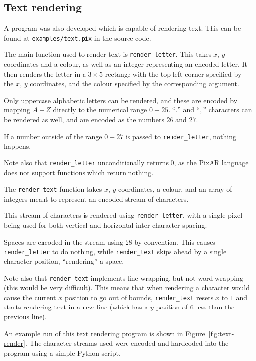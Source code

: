 \documentclass[11pt,a4paper]{scrartcl}
\begin{document}
\subsection{Text rendering}

A program was also developed which is capable of rendering text. This can be found at \verb|examples/text.pix| in the source code.

The main function used to render text is \verb|render_letter|. This takes $x$, $y$ coordinates and a colour, as well as an integer representing an encoded letter. It then renders the letter in a $3 \times 5$ rectange with the top left corner specified by the $x$, $y$ coordinates, and the colour specified by the corresponding argument.

Only uppercase alphabetic letters can be rendered, and these are encoded by mapping $A-Z$ directly to the numerical range $0-25$. ``$.$'' and ``$,$'' characters can be rendered as well, and are encoded as the numbers $26$ and $27$.

If a number outside of the range $0-27$ is passed to \verb|render_letter|, nothing happens.

Note also that \verb|render_letter| unconditionally returns $0$, as the PixAR language does not support functions which return nothing.

The \verb|render_text| function takes $x$, $y$ coordinates, a colour, and an array of integers meant to represent an encoded stream of characters.

This stream of characters is rendered using \verb|render_letter|, with a single pixel being used for both vertical and horizontal inter-character spacing.

Spaces are encoded in the stream using $28$ by convention. This causes \verb|render_letter| to do nothing, while \verb|render_text| skips ahead by a single character position, ``rendering'' a space.

Note also that \verb|render_text| implements line wrapping, but not word wrapping (this would be very difficult). This means that when rendering a character would cause the current $x$ position to go out of bounds, \verb|render_text| resets $x$ to $1$ and starts rendering text in a new line (which has a $y$ position of $6$ less than the previous line).

An example run of this text rendering program is shown in Figure~\ref{fig:text-render}. The
character streams used were encoded and hardcoded into the program using a simple Python script.
\end{document}
